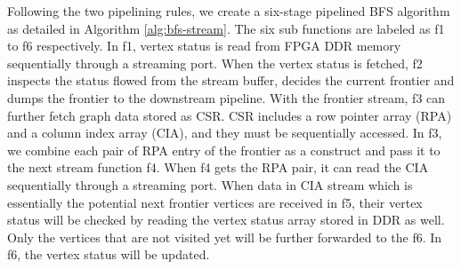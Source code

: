 Following the two pipelining rules, we create a six-stage 
pipelined BFS algorithm as detailed in Algorithm \ref{alg:bfs-stream}. 
The six sub functions are labeled as f1 to f6 respectively. In f1, 
vertex status is read from FPGA DDR memory sequentially through a streaming port. 
When the vertex status is fetched, f2 inspects the status 
flowed from the stream buffer, decides the current frontier 
and dumps the frontier to the downstream pipeline. 
With the frontier stream, f3 can further fetch graph 
data stored as CSR. CSR includes a row pointer array (RPA) 
and a column index array (CIA), and they must be sequentially accessed. 
In f3, we combine each pair of RPA entry of the frontier as a construct 
and pass it to the next stream function f4. When f4 gets the RPA pair, 
it can read the CIA sequentially through a streaming port. 
When data in CIA stream which is essentially the potential 
next frontier vertices are received in f5, their vertex status 
will be checked by reading the vertex status array stored in DDR as well.
Only the vertices that are not visited yet will be further forwarded to the f6. 
In f6, the vertex status will be updated.

